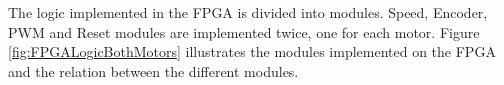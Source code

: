 \documentclass[../../main.tex]{subfiles}
\begin{document}
The logic implemented in the FPGA is divided into modules. Speed, Encoder, PWM and Reset modules are implemented twice, one for each motor. Figure \ref{fig:FPGALogicBothMotors} illustrates the modules implemented on the FPGA and the relation between the different modules.      
    
    
\end{document}
